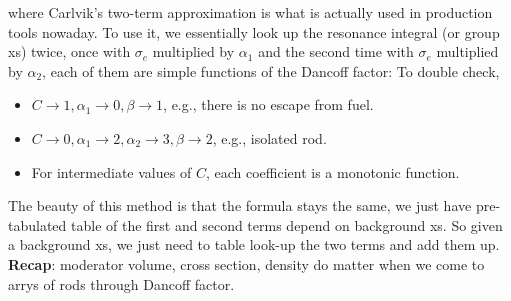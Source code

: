 \documentclass{school-22.211-notes}
\begin{document}
\clearpage
{}
where
Carlvik's two-term approximation is what is actually used in production tools nowaday. To use it, we essentially look up the resonance integral (or group xs) twice, once with $\sigma_e$ multiplied by $\alpha_1$ and the second time with $\sigma_e$ multiplied by $\alpha_2$, each of them are simple functions of the Dancoff factor: 
To double check, 
\begin{itemize}
\item $C\to 1, \alpha_1 \to 0, \beta \to 1$, e.g., there is no escape from fuel.
\item $C\to 0, \alpha_1 \to 2, \alpha_2 \to 3, \beta \to 2$, e.g., isolated rod.
\item For intermediate values of $C$, each coefficient is a monotonic function.
\end{itemize}
The beauty of this method is that the formula stays the same, we just have pre-tabulated table of the first and second terms depend on background xs. So given a background xs, we just need to table look-up the two terms and add them up. \\
\textbf{Recap}: moderator volume, cross section, density do matter when we come to arrys of rods through Dancoff factor.
\end{document}
